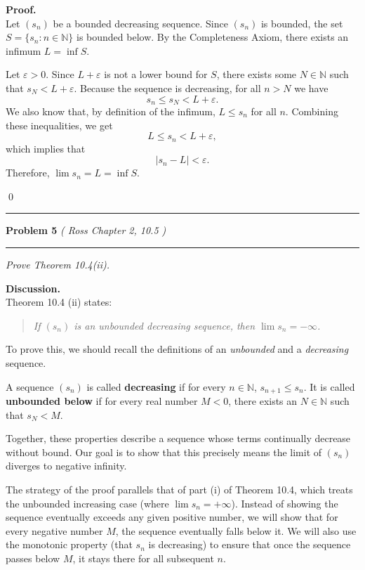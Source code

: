\documentclass[12pt]{article}
\newcommand{\problem}[2][]{%
  \vspace{0.5em}
  \hrule\vspace{0.4em}
  \textbf{Problem #2}\if\relax\detokenize{#1}\relax\else\; \textit{(#1)}\fi
  \vspace{0.25em}\hrule\vspace{0.8em}
}
\begin{document}
\vspace{0.25em}

\textbf{Proof.}\\
Let $(s_n)$ be a bounded decreasing sequence. Since $(s_n)$ is bounded, the set $S = \{s_n : n \in \mathbb{N}\}$ is bounded below. By the Completeness Axiom, there exists an infimum $L = \inf S$.

Let $\varepsilon > 0$. Since $L + \varepsilon$ is not a lower bound for $S$, there exists some $N \in \mathbb{N}$ such that $s_N < L + \varepsilon$. Because the sequence is decreasing, for all $n > N$ we have
\[
s_n \leq s_N < L + \varepsilon.
\]
We also know that, by definition of the infimum, $L \leq s_n$ for all $n$. Combining these inequalities, we get
\[
L \leq s_n < L + \varepsilon,
\]
which implies that
\[
|s_n - L| < \varepsilon.
\]
Therefore, $\lim s_n = L = \inf S$.

\qed

\problem[ Ross Chapter 2, 10.5 ]{5}

\textit{Prove Theorem 10.4(ii).}

\textbf{Discussion.}\\
Theorem 10.4 (ii) states:

\begin{quote}
\textit{If $(s_n)$ is an unbounded decreasing sequence, then $\lim s_n = -\infty$.}
\end{quote}

To prove this, we should recall the definitions of an \textit{unbounded} and a \textit{decreasing} sequence.

A sequence $(s_n)$ is called \textbf{decreasing} if for every $n \in \mathbb{N}$, $s_{n+1} \leq s_n$.  
It is called \textbf{unbounded below} if for every real number $M < 0$, there exists an $N \in \mathbb{N}$ such that $s_N < M$.  

Together, these properties describe a sequence whose terms continually decrease without bound. Our goal is to show that this precisely means the limit of $(s_n)$ diverges to negative infinity.

The strategy of the proof parallels that of part (i) of Theorem 10.4, which treats the unbounded increasing case (where $\lim s_n = +\infty$). Instead of showing the sequence eventually exceeds any given positive number, we will show that for every negative number $M$, the sequence eventually falls below it. We will also use the monotonic property (that $s_n$ is decreasing) to ensure that once the sequence passes below $M$, it stays there for all subsequent $n$.
\end{document}

